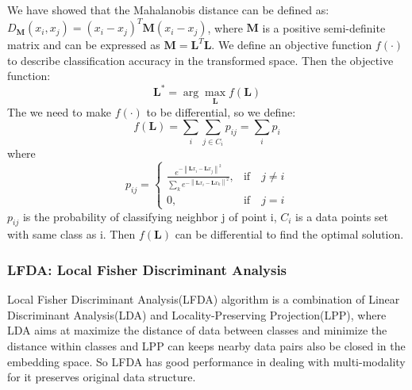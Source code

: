         We have showed that the  Mahalanobis distance can be defined as: $D_{\mathbf{M}}(x_i, x_j) = (x_i - x_j)^T \mathbf{M} (x_i - x_j)$, where $\mathbf{M}$ is a  positive semi-definite matrix and can be expressed as $\mathbf{M} = \mathbf{L}^T \mathbf{L}$. We define an objective function $f(\cdot)$ to describe classification accuracy in the transformed space. Then the objective function:
        $$
            \mathbf{L}^* = \arg \max_{\mathbf{L}} f(\mathbf{L})
        $$
        The we need to make $f(\cdot)$ to be differential, so we define:
        $$
            f(\mathbf{L}) = \sum_i \sum_{j \in C_i} p_{ij} = \sum_i p_i
        $$
        where
        $$
            p_{i j}=\left\{
            \begin{array}{ll} 
                \frac{e^{-\left\|\mathbf{L} x_{i} - \mathbf{L} x_{j}\right\|^{2}}}{\sum_{k} e^{-\left\|\mathbf{L} x_{i}-\mathbf{L} x_{k}\right\|^{2}}}, & \text {if} \quad j \neq i \\
                0, & \text {if} \quad j=i
            \end{array}\right.
        $$
        $p_{ij}$ is the probability of classifying neighbor j of point i, $C_i$ is a data points set with same class as i. Then $f(\mathbf{L})$ can be differential to find the optimal solution.
    
        
\subsubsection{LFDA: Local Fisher Discriminant Analysis}
    
        Local Fisher Discriminant Analysis(LFDA)\cite{LFDA} algorithm is a combination of Linear Discriminant Analysis(LDA) and Locality-Preserving Projection(LPP), where LDA aims at maximize the distance of data between classes and minimize the distance within classes and LPP can keeps nearby data pairs also be closed in the embedding space. So LFDA has good performance in dealing with multi-modality for it preserves original data structure.
        
